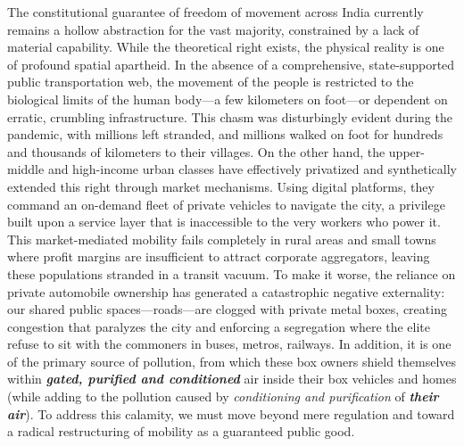 The constitutional guarantee of freedom of movement across India
currently remains a hollow abstraction for the vast majority,
constrained by a lack of material capability. While the theoretical
right exists, the physical reality is one of profound spatial apartheid.
In the absence of a comprehensive, state-supported public transportation
web, the movement of the people is restricted to the biological limits
of the human body---a few kilometers on foot---or dependent on erratic,
crumbling infrastructure. This chasm was disturbingly evident during the
pandemic, with millions left stranded, and millions walked on foot for
hundreds and thousands of kilometers to their villages. On the other
hand, the upper-middle and high-income urban classes have effectively
privatized and synthetically extended this right through market
mechanisms. Using digital platforms, they command an on-demand fleet of
private vehicles to navigate the city, a privilege built upon a service
layer that is inaccessible to the very workers who power it. This
market-mediated mobility fails completely in rural areas and small towns
where profit margins are insufficient to attract corporate aggregators,
leaving these populations stranded in a transit vacuum. To make it
worse, the reliance on private automobile ownership has generated a
catastrophic negative externality: our shared public
spaces---roads---are clogged with private metal boxes, creating
congestion that paralyzes the city and enforcing a segregation where the
elite refuse to sit with the commoners in buses, metros, railways. In
addition, it is one of the primary source of pollution, from which these
box owners shield themselves within \textbf{\emph{gated, purified and
conditioned}} air inside their box vehicles and homes (while adding to
the pollution caused by \emph{conditioning and purification} of
\textbf{\emph{their air}}). To address this calamity, we must move
beyond mere regulation and toward a radical restructuring of mobility as
a guaranteed public good.

